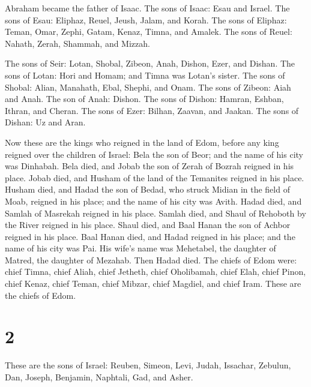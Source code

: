  Abraham became the father of Isaac. The sons of Isaac:
Esau and Israel.  The sons of Esau: Eliphaz, Reuel,
Jeush, Jalam, and Korah.  The sons of Eliphaz: Teman,
Omar, Zephi, Gatam, Kenaz, Timna, and Amalek.  The sons
of Reuel: Nahath, Zerah, Shammah, and Mizzah.

 The sons of Seir: Lotan, Shobal, Zibeon, Anah, Dishon,
Ezer, and Dishan.  The sons of Lotan: Hori and Homam; and
Timna was Lotan's sister.  The sons of Shobal: Alian,
Manahath, Ebal, Shephi, and Onam. The sons of Zibeon: Aiah and Anah.
 The son of Anah: Dishon. The sons of Dishon: Hamran,
Eshban, Ithran, and Cheran.  The sons of Ezer: Bilhan,
Zaavan, and Jaakan. The sons of Dishan: Uz and Aran.

 Now these are the kings who reigned in the land of Edom,
before any king reigned over the children of Israel: Bela the son of
Beor; and the name of his city was Dinhabah.  Bela died,
and Jobab the son of Zerah of Bozrah reigned in his place.
 Jobab died, and Husham of the land of the Temanites
reigned in his place.  Husham died, and Hadad the son of
Bedad, who struck Midian in the field of Moab, reigned in his place; and
the name of his city was Avith.  Hadad died, and Samlah
of Masrekah reigned in his place.  Samlah died, and Shaul
of Rehoboth by the River reigned in his place.  Shaul
died, and Baal Hanan the son of Achbor reigned in his place.
 Baal Hanan died, and Hadad reigned in his place; and the
name of his city was Pai. His wife's name was Mehetabel, the daughter of
Matred, the daughter of Mezahab.  Then Hadad died. The
chiefs of Edom were: chief Timna, chief Aliah, chief Jetheth,
 chief Oholibamah, chief Elah, chief Pinon,
 chief Kenaz, chief Teman, chief Mibzar, 
chief Magdiel, and chief Iram. These are the chiefs of Edom.

\hypertarget{section-1}{%
\section{2}\label{section-1}}

 These are the sons of Israel: Reuben, Simeon, Levi,
Judah, Issachar, Zebulun,  Dan, Joseph, Benjamin,
Naphtali, Gad, and Asher.

